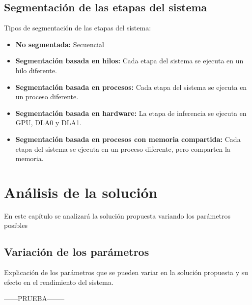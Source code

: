 \documentclass[11pt,spanish,listoffigures,listoftables]{tfgetsinf}
\begin{document}
\section{Segmentación de las etapas del sistema}

Tipos de segmentación de las etapas del sistema:

\begin{itemize}
   \item \textbf{No segmentada:} Secuencial
   \item \textbf{Segmentación basada en hilos:} Cada etapa del sistema se ejecuta en un hilo diferente.
   \item \textbf{Segmentación basada en procesos:} Cada etapa del sistema se ejecuta en un proceso diferente.
   \item \textbf{Segmentación basada en hardware:} La etapa de inferencia se ejecuta en GPU, DLA0 y DLA1.
   \item \textbf{Segmentación basada en procesos con memoria compartida:} Cada etapa del sistema se ejecuta en un proceso diferente, pero comparten la memoria.
\end{itemize}
    


\chapter{Análisis de la solución}

En este capítulo se analizará la solución propuesta variando los parámetros posibles

\section{Variación de los parámetros}
Explicación de los parámetros que se pueden variar en la solución propuesta y su efecto en el rendimiento del sistema.

------PRUEBA--------
\end{document}
